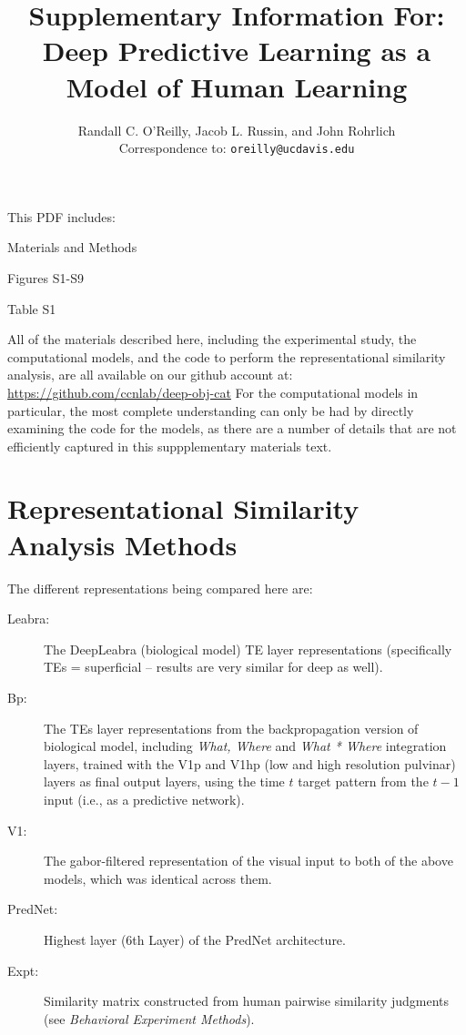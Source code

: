 \documentclass[12pt,twoside]{naturefigs}
\title{ Supplementary Information For:\\
Deep Predictive Learning as a Model of Human Learning }
\author{Randall C. O'Reilly, Jacob L. Russin, and John Rohrlich\\
  Correspondence to: \texttt{oreilly@ucdavis.edu}\\}
\newif\myifpdf
\begin{document}
\sloppy
\raggedbottom

\maketitle 

\noindent This PDF includes:
\begin{description}
\item Materials and Methods
\item Figures S1-S9
\item Table S1
\end{description}

\clearpage

\pagestyle{myheadings}

All of the materials described here, including the experimental study, the computational models, and the code to perform the representational similarity analysis, are all available on our github account at: \url{https://github.com/ccnlab/deep-obj-cat}  For the computational models in particular, the most complete understanding can only be had by directly examining the code for the models, as there are a number of details that are not efficiently captured in this suppplementary materials text.

\section{Representational Similarity Analysis Methods}

The different representations being compared here are:
\begin{description}
\item[Leabra:] The DeepLeabra (biological model) TE layer representations (specifically TEs = superficial -- results are very similar for deep as well).
\item[Bp:] The TEs layer representations from the backpropagation version of biological model, including {\em What, Where} and {\em What * Where} integration layers, trained with the V1p and V1hp (low and high resolution pulvinar) layers as final output layers, using the time $t$ target pattern from the $t-1$ input (i.e., as a predictive network).
\item[V1:] The gabor-filtered representation of the visual input to both of the above models, which was identical across them.
\item[PredNet:] Highest layer (6th Layer) of the PredNet architecture.

\item[Expt:] Similarity matrix constructed from human pairwise similarity judgments (see {\em Behavioral Experiment Methods}).
\end{description}
\end{document}
